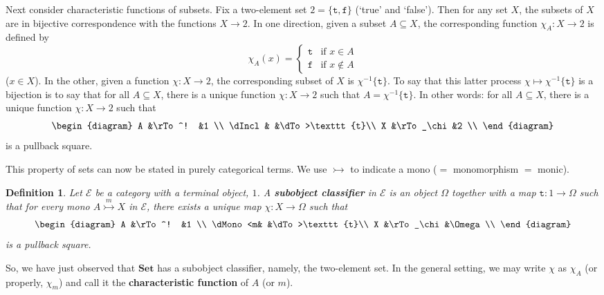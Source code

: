 \documentclass[12pt]{article}
\newcommand{\cat}[1]{\mathscr{#1}}
\newcommand{\fcat}[1]{\mathbf{#1}}
\newcommand{\Set}{\fcat{Set}}
\newcommand{\demph}[1]{\textbf{\textup{#1}}}
\newcommand{\sub}{\subseteq}
\newcommand{\tr}{\texttt{t}}
\newcommand{\fa}{\texttt{f}}
\newcommand{\E}{\cat{E}}
\newcommand{\monic}{\rightarrowtail}
\newcommand{\monicby}[1]{\stackrel{#1}{\monic}}
\newcommand{\cln}{\colon}
\newtheorem{predefn}[thm]{Definition}
\newenvironment{defn}{\begin{predefn}\upshape}{\end{predefn}}
\begin{document}
Next consider characteristic functions of subsets.  Fix a two-element set $2 =
\{\tr, \fa\}$ (`true' and `false').  Then for any set $X$, the subsets of $X$
are in bijective correspondence with the functions $X \to 2$.  In one
direction, given a subset $A \sub X$, the corresponding function $\chi_A\cln X
\to 2$ is defined by
\[
\chi_A(x)
=
\begin{cases}
\tr     &\text{if } x \in A     \\
\fa     &\text{if } x \not\in A
\end{cases}
\]
($x \in X$).  In the other, given a function $\chi\cln X \to 2$, the
corresponding subset of $X$ is $\chi^{-1}\{\tr\}$.  To say that this latter
process $\chi \mapsto \chi^{-1}\{\tr\}$ is a bijection is to say that for all
$A \sub X$, there is a unique function $\chi\cln X \to 2$ such that $A =
\chi^{-1}\{\tr\}$.  In other words: for all $A \sub X$, there is a unique
function $\chi\cln X \to 2$ such that
\[
\begin{diagram}
A       &\rTo^!         &1              \\
\dIncl  &               &\dTo>\tr       \\
X       &\rTo_\chi      &2              \\
\end{diagram}
\]
is a pullback square.

This property of sets can now be stated in purely categorical terms.  We use
$\monic$ to indicate a mono ($=$ monomorphism $=$ monic).  

\begin{defn}
Let $\E$ be a category with a terminal object, $1$.  A \demph{subobject
classifier} in $\E$ is an object $\Omega$ together with a map $\tr\cln 1 \to
\Omega$ such that for every mono $A \monicby{m} X$ in $\E$, there exists a
unique map $\chi\cln X \to \Omega$ such that
\[
\begin{diagram}
A       &\rTo^!         &1              \\
\dMono<m&               &\dTo>\tr       \\
X       &\rTo_\chi      &\Omega         \\
\end{diagram}
\]
is a pullback square.
\end{defn}

So, we have just observed that $\Set$ has a subobject classifier, namely, the
two-element set.  In the general setting, we may write $\chi$ as $\chi_A$ (or
properly, $\chi_m$) and call it the \demph{characteristic function} of $A$ (or
$m$).
\end{document}
